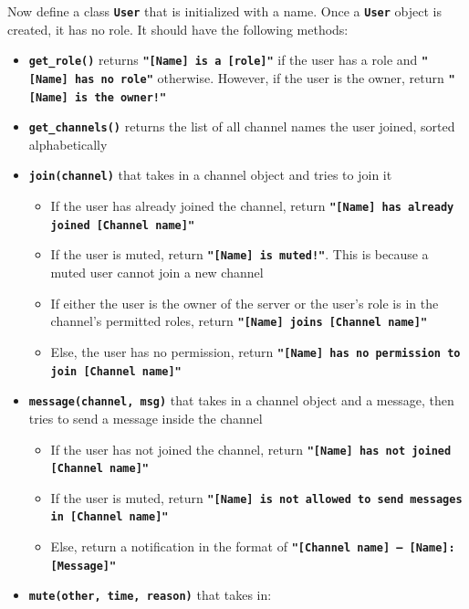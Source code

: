 Now define a class \texttt{\bfseries User} that is initialized with a name. Once a \texttt{\bfseries User} object is created, it has no role. It should have the following methods:
\begin{itemize}
    \item \texttt{\bfseries get\_role()} returns \texttt{\bfseries "[Name] is a [role]"} if the user has a role and 
    \texttt{\bfseries "[Name] has no role"} otherwise. However, if the user is the owner, return \texttt{\bfseries "[Name] is the owner!"}
    \item \texttt{\bfseries get\_channels()} returns the list of all channel names the user joined, sorted alphabetically
    \item \texttt{\bfseries join(channel)} that takes in a channel object and tries to join it
    \begin{itemize}
        \item If the user has already joined the channel, return \texttt{\bfseries "[Name] has already joined [Channel name]"}
        \item If the user is muted, return \texttt{\bfseries "[Name] is muted!"}. This is because a muted user cannot join a new channel
        \item If either the user is the owner of the server or the user's role is in the channel's permitted roles, return \texttt{\bfseries "[Name] joins [Channel name]"}
        \item Else, the user has no permission, return \texttt{\bfseries "[Name] has no permission to join [Channel name]"}
    \end{itemize}
    \item \texttt{\bfseries message(channel, msg)} that takes in a channel object and a message, then tries to send a message inside the channel
    \begin{itemize}
        \item If the user has not joined the channel, return \texttt{\bfseries "[Name] has not joined [Channel name]"}
        \item If the user is muted, return \texttt{\bfseries "[Name] is not allowed to send messages in [Channel name]"}
        \item Else, return a notification in the format of \texttt{\bfseries "[Channel name] --- [Name]: [Message]"}
    \end{itemize}
    \item \texttt{\bfseries mute(other, time, reason)} that takes in:
    \begin{itemize}

\end{itemize}
\end{itemize}
